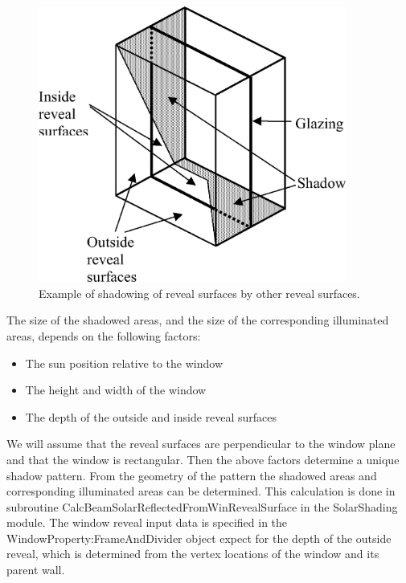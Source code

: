 \begin{figure}[hbtp] %
\centering
\includegraphics[width=0.9\textwidth, height=0.9\textheight, keepaspectratio=true]{media/image1593.png}
\caption{  Example of shadowing of reveal surfaces by other reveal surfaces. \protect \label{fig:example-of-shadowing-of-reveal-surfaces-by}}
\end{figure}

The size of the shadowed areas, and the size of the corresponding illuminated areas, depends on the following factors:

\begin{itemize}
\item
  The sun position relative to the window
\item
  The height and width of the window
\item
  The depth of the outside and inside reveal surfaces
\end{itemize}

We will assume that the reveal surfaces are perpendicular to the window plane and that the window is rectangular. Then the above factors determine a unique shadow pattern. From the geometry of the pattern the shadowed areas and corresponding illuminated areas can be determined. This calculation is done in subroutine CalcBeamSolarReflectedFromWinRevealSurface in the SolarShading module. The window reveal input data is specified in the WindowProperty:FrameAndDivider object expect for the depth of the outside reveal, which is determined from the vertex locations of the window and its parent wall.

